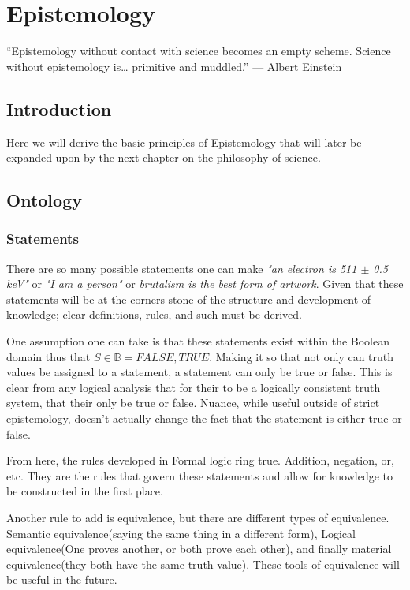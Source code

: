 \chapter{Epistemology}
“Epistemology without contact with science becomes an empty scheme. Science without epistemology is… primitive and muddled.” — Albert Einstein

\section{Introduction}
Here we will derive the basic principles of Epistemology that will later be expanded upon by the next chapter on the philosophy of science.
\section{Ontology}

\subsection{Statements}

There are so many possible statements one can make \emph{"an electron is 511 $\pm$ 0.5 keV"} or \emph{"I am a person"} or \emph{brutalism is the
best form of artwork}. Given that these statements will be at the corners stone of the structure and development of knowledge; clear definitions, rules,
and such must be derived.

One assumption one can take is that these statements exist within the Boolean domain thus that $S \in \mathbb{B} = {FALSE, TRUE}$. Making it so that not
only can truth values be assigned to a statement, a statement can only be true or false. This is clear from any logical analysis that for their to be
a logically consistent truth system, that their only be true or false. Nuance, while useful outside of strict epistemology, doesn't actually change
the fact that the statement is either true or false.

From here, the rules developed in Formal logic ring true. Addition, negation, or, etc. They are the rules that govern these statements and allow for
knowledge to be constructed in the first place.

Another rule to add is equivalence, but there are different types of equivalence. Semantic equivalence(saying the same thing in a different form),
Logical equivalence(One proves another, or both prove each other), and finally material equivalence(they both have the same truth value). These tools of
equivalence will be useful in the future.

